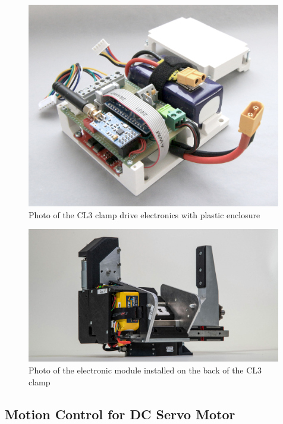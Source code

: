 \begin{figure}
    \centering
    \includegraphics[width=0.99\textwidth]{images/05/image31.jpg}
    \caption{Photo of the CL3 clamp drive electronics with plastic enclosure}
    \label{fig:photo-cl3-clamp-electronics}
\end{figure}

\begin{figure}
    \centering
    \includegraphics[width=0.99\textwidth]{images/05/image64.jpg}
    \caption{Photo of the electronic module installed on the back of the CL3 clamp}
    \label{fig:photo-cl3-with-electronics-installed}
\end{figure}

\FloatBarrier

\subsection{Motion Control for DC Servo Motor}
\label{subsection:exploration-2-motion-control-for-dc-servo-motor}

